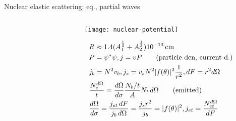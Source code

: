\begin{frame}{Nuclear elastic scattering: \schr{} eq., partial waves}
\begin{columns}[T]
\begin{column}{0.55\textwidth}
        \end{column}
        \begin{column}{0.45\textwidth} 
            \begin{figure}[!ht]\texttt{[image: nuclear-potential]}\label{fig:nuclear-potential}
			\end{figure}
            \begin{align*}
                &R\approx1.4(A_1^{\frac{1}{3}}+A_2^{\frac{1}{3}})\SI{e-13}{\cm}\\
                &P=\psi^*\psi,j=vP\tag{particle-den, current-d.}\\
                &j_b=N^2v_b, j_s=v_sN^2|f(\theta)|^2 \frac{1}{r^2},dF=r^2d\Omega\\
                &\frac{N_e^{d\Omega}}{t}=\TDy{\sigma}{\Omega}\frac{N_b/t}{A}N_t\,d\Omega\tag{emitted}\\
                &\TDy{\sigma}{\Omega}=\frac{j_{et}\,dF}{j_b\,d\Omega}=\frac{j_sr^2}{j_b}=|f(\theta)|^2,j_{et}=\frac{N_{et}^{d\Omega}}{dF}
            \end{align*}
        \end{column}
    \end{columns}
\end{frame}

